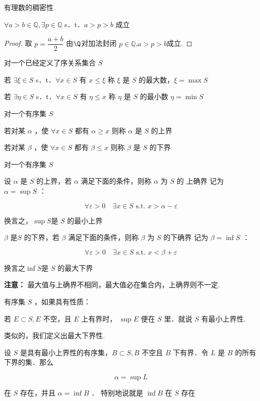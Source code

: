 \begin{theorem}有理数的稠密性
	
	$\forall a>b \in \mathbb{Q}, \exists p \in \mathbb{Q}$ s．t．$a>p>b$ 成立
	
\end{theorem}
\begin{proof}
	取 $p=\dfrac{a+b}{2}$ 由$\Q$对加法封闭 $p \in \mathbb{Q}$,$a>p>b$成立. 
\end{proof}
\begin{definition}
	对一个已经定义了序关系集合 $S$
	
	若 $\exists \xi \in S$ s．t．$\forall x \in S$ 有 $x \leqslant \xi$ 称 $\xi$ 是 $S$ 的最大数，$\xi=\max S$
	
	若 $\exists \eta \in S$ s．t．$\forall x \in S$ 有 $\eta \leqslant x$ 称 $\eta$ 是 $S$ 的最小数 $\eta=\min S$
\end{definition}
\begin{definition}
	对一个有序集 $S$
	
	若对某 $\alpha$ ，使 $\forall x \in S$ 都有 $\alpha \geqslant x$ 则称 $\alpha$ 是 $S$ 的上界
	
	若对某 $\beta$ ，使 $\forall x \in S$ 都有 $\beta \leqslant x$ 则称 $\beta$ 是 $S$ 的下界
	
\end{definition}
\begin{definition}对一个有序集 $S$
	
	设 $\alpha$ 是 $S$ 的上界，若 $\alpha$ 满足下面的条件，则称 $\alpha$ 为 $S$ 的 上确界 记为 $\alpha=\sup S$ ：
	
	$$
	\forall \varepsilon>0 \quad \exists x \in S \text { s.t. } x>\alpha-\varepsilon
	$$
	
	
	换言之，$\sup S$是 $S$ 的最小上界
	
	$\beta$ 是$S$ 的下界，若 $\beta$ 满足下面的条件，则称 $\beta$ 为 $S$ 的下确界 记为 $\beta=\inf S$ ：
	
	$$
	\forall \varepsilon>0\quad \exists x \in S \text { s.t. } x<\beta+\varepsilon
	$$
	
	
	换言之$\inf S$是 $S$ 的最大下界
\end{definition}
\textbf{注意：}
	最大值与上确界不相同，最大值必在集合内，上确界则不一定.

\begin{definition}
	有序集 $S$ ，如果具有性质：
	
	若 $E \subset S, E$ 不空，且 $E$ 上有界时， $\sup E$ 便在 $S$ 里．就说 $S$ 有最小上界性.
	
	类似的，我们定义出最大下界性.
\end{definition}
\begin{proposition}
	设 $S$ 是具有最小上界性的有序集，$B \subset S, B$ 不空且 $B$ 下有界．令 $L$ 是 $B$ 的所有下界的集．那么
	
	$$
	\alpha=\sup L
	$$
	
	
	在 $S$ 存在，并且 $\alpha=\inf B$ ．
	特别地说就是 $\inf B$ 在 $S$ 存在
\end{proposition}

